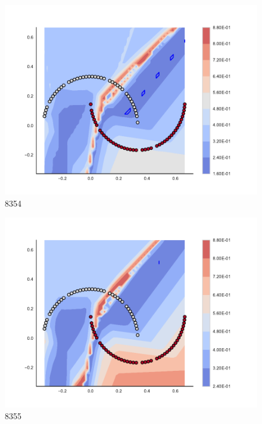 \begin{subfigure}[b]{0.09\textwidth}
    \includegraphics[clip, trim=2.35cm 1.75cm 4.5cm 0cm,width=\textwidth]{img/convergence/8354.pdf}
    \caption{8354}
    \label{fig:convergence_8354}
\end{subfigure}
%
\begin{subfigure}[b]{0.09\textwidth}
    \includegraphics[clip, trim=2.35cm 1.75cm 4.5cm 0cm,width=\textwidth]{img/convergence/8355.pdf}
    \caption{8355}
    \label{fig:convergence_8355}
\end{subfigure}
%
